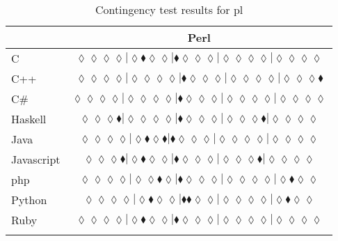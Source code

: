 \begin{table*}
\centering
\begin{tabular}{l c}
& Perl \\
\hline

C & $\scriptscriptstyle\lozenge\lozenge\lozenge\lozenge|\lozenge\blacklozenge\lozenge\lozenge|\blacklozenge\lozenge\lozenge\lozenge|\lozenge\lozenge\lozenge\lozenge|\lozenge\lozenge\lozenge\lozenge$ \\
C++ & $\scriptscriptstyle\lozenge\lozenge\lozenge\lozenge|\lozenge\lozenge\lozenge\lozenge|\blacklozenge\lozenge\lozenge\lozenge|\lozenge\lozenge\lozenge\lozenge|\lozenge\lozenge\lozenge\blacklozenge$ \\
C\# & $\scriptscriptstyle\lozenge\lozenge\lozenge\lozenge|\lozenge\lozenge\lozenge\lozenge|\blacklozenge\lozenge\lozenge\lozenge|\lozenge\lozenge\lozenge\lozenge|\lozenge\lozenge\lozenge\lozenge$ \\
Haskell & $\scriptscriptstyle\lozenge\lozenge\lozenge\blacklozenge|\lozenge\lozenge\lozenge\lozenge|\blacklozenge\lozenge\lozenge\lozenge|\lozenge\lozenge\lozenge\blacklozenge|\lozenge\lozenge\lozenge\lozenge$ \\
Java & $\scriptscriptstyle\lozenge\lozenge\lozenge\lozenge|\lozenge\blacklozenge\lozenge\blacklozenge|\blacklozenge\lozenge\lozenge\lozenge|\lozenge\lozenge\lozenge\lozenge|\lozenge\lozenge\lozenge\lozenge$ \\
Javascript & $\scriptscriptstyle\lozenge\lozenge\lozenge\blacklozenge|\lozenge\blacklozenge\lozenge\lozenge|\blacklozenge\lozenge\lozenge\lozenge|\lozenge\lozenge\lozenge\blacklozenge|\lozenge\lozenge\lozenge\lozenge$ \\
{\sc php} & $\scriptscriptstyle\lozenge\lozenge\lozenge\lozenge|\lozenge\lozenge\blacklozenge\lozenge|\blacklozenge\lozenge\lozenge\lozenge|\lozenge\lozenge\lozenge\lozenge|\lozenge\blacklozenge\lozenge\lozenge$ \\
Python & $\scriptscriptstyle\lozenge\lozenge\lozenge\lozenge|\lozenge\blacklozenge\lozenge\lozenge|\blacklozenge\blacklozenge\lozenge\lozenge|\lozenge\lozenge\lozenge\lozenge|\lozenge\blacklozenge\lozenge\lozenge$ \\
Ruby & $\scriptscriptstyle\lozenge\lozenge\lozenge\lozenge|\lozenge\blacklozenge\lozenge\lozenge|\blacklozenge\lozenge\lozenge\lozenge|\lozenge\lozenge\lozenge\lozenge|\lozenge\lozenge\lozenge\lozenge$ \\

\hline
& \\
\end{tabular}
\caption{Contingency test results for pl}
\label{tbl:contingency-test-results-pl}
\end{table*}


